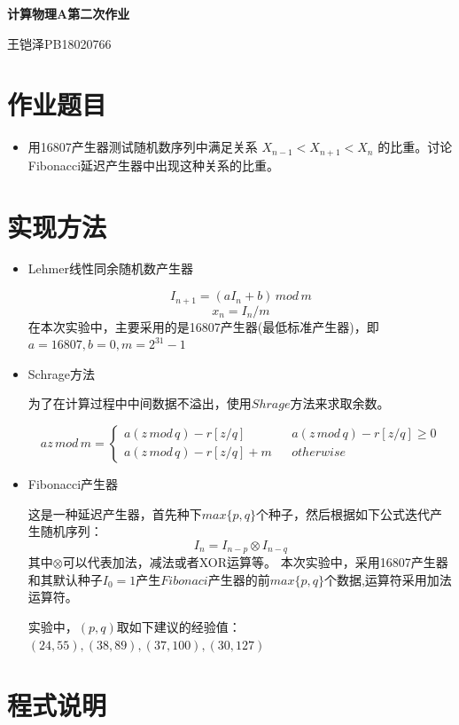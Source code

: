 \documentclass[UTF8]{ctexart}
\begin{document}
	\centering\textbf{\LARGE{计算物理A第二次作业}}
	
	
	王铠泽\qquad PB18020766
	
		
	\section{作业题目}
	
	\begin{itemize}
		\item 用16807产生器测试随机数序列中满足关系 $X_{n-1}<X_{n+1}<X_n$
		的比重。讨论Fibonacci延迟产生器中出现这种关系的比重。
	\end{itemize}
	
	\section{实现方法}
	
	\begin{itemize}
		\item Lehmer线性同余随机数产生器
		
		$$I_{n+1}=(aI_n+b)\,mod\,m$$
		$$x_n=I_n/m$$
		在本次实验中，主要采用的是16807产生器(最低标准产生器)，即 $a=16807,b=0,m=2^{31}-1$
		\item Schrage方法
		
		为了在计算过程中中间数据不溢出，使用$Shrage$方法来求取余数。
		
		$$az\,mod\, m=\left\{
		\begin{array}{lcl}
		a(z\,mod\,q)-r[z/q]       &      &a(z\,mod\,q)-r[z/q] \geq0 \\
		a(z\,mod\,q)-r[z/q]+m&      & otherwise
		\end{array} \right. $$
		
		\item Fibonacci产生器
		
		这是一种延迟产生器，首先种下$max\{p,q\}$个种子，然后根据如下公式迭代产生随机序列：
		$$I_n=I_{n-p}\otimes I_{n-q}$$
		其中$\otimes$可以代表加法，减法或者XOR运算等。
		本次实验中，采用16807产生器和其默认种子$I_0=1$产生$Fibonaci$产生器的前$max\{p,q\}$个数据,运算符采用加法运算符。
		
		实验中，$(p,q)$取如下建议的经验值：
		$(24,55),(38,89),(37,100),(30,127)$
		
	\end{itemize}
	\section{程式说明}
	
\end{document}

